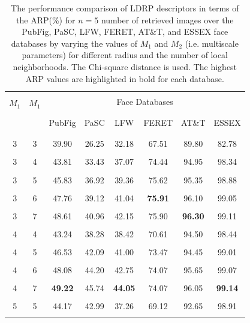 \documentclass[a4paper]{article}
\begin{document}
\begin{table}[!t]
\caption{The performance comparison of LDRP descriptors in terms of the ARP(\%) for $n=5$ number of retrieved images over the PubFig, PaSC, LFW, FERET, AT\&T, and ESSEX face databases by varying the values of $M_1$ and $M_2$ (i.e. multiscale parameters) for different radius and the number of local neighborhoods. The Chi-square distance is used. The highest ARP values are highlighted in bold for each database.}
\label{t1}
\begin{center}
\begin{tabular}{cccccccc}
\hline
\\[-0.65em] \multirow{2}{*}{$M_1$} & \multirow{2}{*}{$M_1$} & \multicolumn{6}{c}{Face Databases}\\ \\[-0.65em]
\cline{3-8} 
\\[-0.65em]  & & PubFig & PaSC & LFW & FERET & AT\&T & ESSEX \\ \\[-0.65em]
\hline
\\[-0.65em]
3 & 3 & 39.90 & 26.25 & 32.18 & 67.51 & 89.80 & 82.78\\ \\[-0.85em]
3 & 4 & 43.81 & 33.43 & 37.07 & 74.44 & 94.95 & 98.34\\ \\[-0.85em]
3 & 5 & 45.83 & 36.92 & 39.36 & 75.62 & 95.35 & 98.88\\ \\[-0.85em]
3 & 6 & 47.76 & 39.12 & 41.04 & \textbf{75.91} & 96.10 & 99.05\\ \\[-0.85em]
3 & 7 & 48.61 & 40.96 & 42.15 & 75.90 & \textbf{96.30} & 99.11\\ \\[-0.85em]
4 & 4 & 43.24 & 38.28 & 38.42 & 70.61 & 94.50 & 98.44\\ \\[-0.85em]
4 & 5 & 46.53 & 42.09 & 41.00 & 73.47 & 94.45 & 99.01\\ \\[-0.85em]
4 & 6 & 48.08 & 44.20 & 42.75 & 74.07 & 95.65 & 99.07\\ \\[-0.85em]
4 & 7 & \textbf{49.22} & 45.74 & \textbf{44.05} & 74.07 & 96.05 & \textbf{99.14}\\ \\[-0.85em]
5 & 5 & 44.17 & 42.99 & 37.26 & 69.12 & 92.65 & 98.91\\ \\[-0.85em]

\end{tabular}
\end{center}
\end{table}
\end{document}
